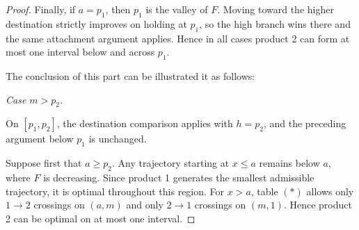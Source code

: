 \documentclass[11pt]{article}
\begin{document}
\begin{proof}
Finally, if $a=p_1$, then $p_1$ is the valley of $F$. Moving toward the
higher destination strictly improves on holding at $p_1$, so the high
branch wins there and the same attachment argument applies. Hence in
all cases product 2 can form at most one interval below and across
$p_1$. 

The conclusion of this part can be illustrated it as follows: 

\begin{figure}[H]
\centering
{}
\end{figure}

\medskip\noindent\textit{Case $m>p_2$.}


On $[p_1,p_2]$, the destination comparison applies with $h=p_2$, and the
preceding argument below $p_1$ is unchanged.

Suppose first that $a\geq p_2$. Any trajectory starting at $x\leq a$ remains below $a$, where $F$ is decreasing. Since product 1 generates the
smallest admissible trajectory, it is optimal throughout this region. For $x>a$, table $(*)$ allows only $1\to2$ crossings on $(a,m)$ and only
$2\to1$ crossings on $(m,1)$. Hence product 2 can be optimal on at most one interval.



\end{proof}
\end{document}
